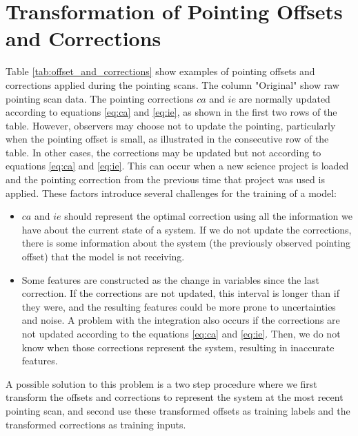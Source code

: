 \section{Transformation of Pointing Offsets and Corrections}

Table \ref{tab:offset_and_corrections} show examples of pointing offsets and corrections applied during the pointing scans.
The column "Original" show raw pointing scan data.
The pointing corrections $ca$ and $ie$ are normally updated according to equations \eqref{eq:ca} and \eqref{eq:ie}, 
as shown in the first two rows of the table.
However, observers may choose not to update the pointing, particularly when the pointing offset is small, as illustrated in the consecutive row of the table.
In other cases, the corrections may be updated but not according to equations \eqref{eq:ca} and \eqref{eq:ie}.
This can occur when a new science project is loaded and the pointing correction from the previous time that project was used is applied.
These factors introduce several challenges for the training of a model:
\begin{itemize}
    \item $ca$ and $ie$ should represent the optimal correction using all the information we have about the current state of a system.
    If we do not update the corrections, there is some information about the system (the previously observed pointing offset) that the model is not receiving.
    \item Some features are constructed as the change in variables since the last correction.
    If the corrections are not updated, this interval is longer than if they were, and the resulting features could be more prone to uncertainties and noise.
    A problem with the integration also occurs if the corrections are not updated according to the equations \eqref{eq:ca} and \eqref{eq:ie}.
    Then, we do not know when those corrections represent the system, resulting in inaccurate features.
\end{itemize}

A possible solution to this problem is a two step procedure where we first transform the offsets and corrections to represent the system at the most recent pointing scan,
and second use these transformed offsets as training labels and the transformed corrections as training inputs.

